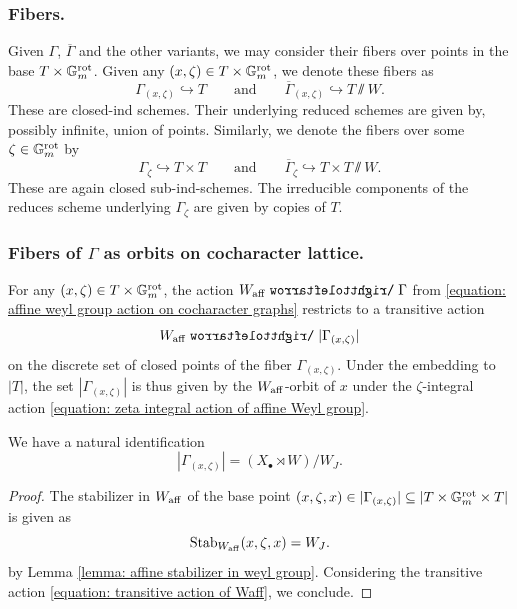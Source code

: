 \subsubsection{Fibers.}\label{section: fibers}
Given $\Gamma$, $\overline{\Gamma}$ and the other variants, we may consider their fibers over points in the base $T \times \mathbb{G}_m^{\mathrm{rot}}$. 
%
Given any $(x, \zeta) \in T \times \mathbb{G}_m^{\mathrm{rot}}$, we denote these fibers as
\begin{equation*}
    \Gamma_{(x, \zeta)} \hookrightarrow T 
    \qquad
    \text{and}
    \qquad
    \overline{\Gamma}_{(x, \zeta)} \hookrightarrow T\sslash W.
\end{equation*}
These are closed-ind schemes. Their underlying reduced schemes are given by, possibly infinite, union of points.
%
Similarly, we denote the fibers over some $\zeta \in \mathbb{G}_m^{\mathrm{rot}}$ by
\begin{equation*}
    \Gamma_{\zeta} \hookrightarrow  T \times T 
    \qquad
    \text{and}
    \qquad
    \overline{\Gamma}_{\zeta} \hookrightarrow T \times T\sslash W.
\end{equation*}
These are again closed sub-ind-schemes. The irreducible components of the reduces scheme underlying $\Gamma_{\zeta}$ are given by copies of $T$.




\subsubsection{Fibers of $\Gamma$ as orbits on cocharacter lattice.}\label{section: specializations of the lattice}
For any $(x, \zeta) \in T \times \mathbb{G}_m^{\mathrm{rot}}$, the action $W_{\aff} \acts \Gamma$ from \eqref{equation: affine weyl group action on cocharacter graphs} restricts to a transitive action
\begin{equation}\label{equation: transitive action of Waff}
  W_{\aff} \acts |\Gamma_{(x, \zeta)}|
\end{equation}
on the discrete set of closed points of the fiber $\Gamma_{(x, \zeta)}$. Under the embedding to $|T|$, the set $|\Gamma_{(x, \zeta)}|$ is thus given by the $W_{\mathrm{aff}}$-orbit of $x$ under the $\zeta$-integral action \eqref{equation: zeta integral action of affine Weyl group}. 

\begin{lemma}\label{lemma: identification of fibers of Gamma}
We have a natural identification  
\begin{equation*}
 |\Gamma_{(x, \zeta)}| = (X_{\bullet} \rtimes W) /  W_J.
\end{equation*}
\end{lemma}
\begin{proof}
The stabilizer in $W_{\mathrm{aff}}$ of the base point $(x, \zeta, x) \in |\Gamma_{(x, \zeta)}| \subseteq |T \times \mathbb{G}_m^{\mathrm{rot}} \times T|$ is given as
\begin{equation*}
    \operatorname{Stab}_{W_{\mathrm{aff}}}(x, \zeta, x) = W_J.
\end{equation*}
by Lemma \ref{lemma: affine stabilizer in weyl group}. Considering the transitive action \eqref{equation: transitive action of Waff}, we conclude.
\end{proof}


